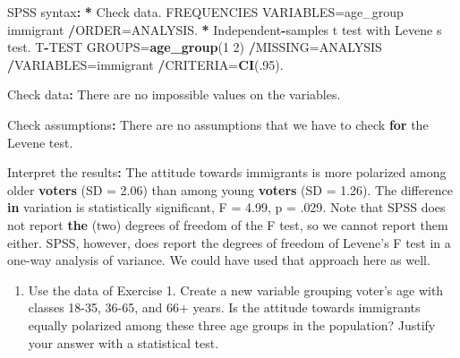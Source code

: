 \documentclass[a4paper]{book}
\newenvironment{Shaded}{\begin{snugshade}}{\end{snugshade}}
\newcommand{\KeywordTok}[1]{\textcolor[rgb]{0,0,0}{\textbf{#1}}}
\newcommand{\DataTypeTok}[1]{\textcolor[rgb]{0,0,0}{#1}}
\newcommand{\DecValTok}[1]{\textcolor[rgb]{0.00,0.00,0.00}{#1}}
\newcommand{\FloatTok}[1]{\textcolor[rgb]{0.00,0.00,0.00}{#1}}
\newcommand{\StringTok}[1]{\textcolor[rgb]{0.00,0.00,0.00}{#1}}
\newcommand{\ControlFlowTok}[1]{\textcolor[rgb]{0.00,0.00,0.00}{\textbf{#1}}}
\newcommand{\OperatorTok}[1]{\textcolor[rgb]{0.00,0.00,0.00}{\textbf{#1}}}
\newcommand{\ErrorTok}[1]{\textcolor[rgb]{0.00,0.00,0.00}{\textbf{#1}}}
\newcommand{\NormalTok}[1]{#1}
\providecommand{\tightlist}{%
  \setlength{\itemsep}{0pt}\setlength{\parskip}{0pt}}
\theoremstyle{definition}
\theoremstyle{definition}
\theoremstyle{definition}
\theoremstyle{remark}
\begin{document}
\begin{Shaded}
\begin{Highlighting}[]
\NormalTok{SPSS syntax}\OperatorTok{:}\StringTok{  }
\StringTok{  }
\ErrorTok{*}\StringTok{ }\NormalTok{Check data.  }
\NormalTok{FREQUENCIES VARIABLES=age_group immigrant  }
  \OperatorTok{/}\NormalTok{ORDER=ANALYSIS.  }
\OperatorTok{*}\StringTok{ }\NormalTok{Independent}\OperatorTok{-}\NormalTok{samples t test with Levene s test.  }
\NormalTok{T}\OperatorTok{-}\NormalTok{TEST GROUPS=}\KeywordTok{age_group}\NormalTok{(}\DecValTok{1} \DecValTok{2}\NormalTok{)  }
  \OperatorTok{/}\NormalTok{MISSING=ANALYSIS  }
  \OperatorTok{/}\NormalTok{VARIABLES=immigrant  }
  \OperatorTok{/}\NormalTok{CRITERIA=}\KeywordTok{CI}\NormalTok{(.}\DecValTok{95}\NormalTok{).  }
  
\NormalTok{Check data}\OperatorTok{:}\StringTok{  }
\StringTok{  }
\NormalTok{There are no impossible values on the variables.  }
  
\NormalTok{Check assumptions}\OperatorTok{:}\StringTok{  }
\StringTok{  }
\NormalTok{There are no assumptions that we have to check }\ControlFlowTok{for}  
\NormalTok{the Levene test.  }
  
\NormalTok{Interpret the results}\OperatorTok{:}\StringTok{  }
\StringTok{  }
\NormalTok{The attitude towards immigrants is more polarized among  }
\NormalTok{older }\KeywordTok{voters}\NormalTok{ (}\DataTypeTok{SD =} \FloatTok{2.06}\NormalTok{) than among young }\KeywordTok{voters}\NormalTok{ (}\DataTypeTok{SD =} \FloatTok{1.26}\NormalTok{).  }
\NormalTok{The difference }\ControlFlowTok{in}\NormalTok{ variation is statistically significant,  }
\NormalTok{F =}\StringTok{ }\FloatTok{4.99}\NormalTok{, p =}\StringTok{ }\NormalTok{.}\DecValTok{029}\NormalTok{.  }
\NormalTok{Note that SPSS does not report }\KeywordTok{the}\NormalTok{ (two) degrees of freedom  }
\NormalTok{of the F test, so we cannot report them either.   }
\NormalTok{SPSS, however, does report the degrees of freedom of Levene}\StringTok{'s F test in a  }
\StringTok{one-way analysis of variance. We could have used that approach here as well.  }
\end{Highlighting}
\end{Shaded}

\begin{enumerate}
\def\labelenumi{\arabic{enumi}.}
\setcounter{enumi}{1}
\tightlist
\item
  Use the data of Exercise 1. Create a new variable grouping voter's age
  with classes 18-35, 36-65, and 66+ years. Is the attitude towards
  immigrants equally polarized among these three age groups in the
  population? Justify your answer with a statistical test.
\end{enumerate}
\end{document}
